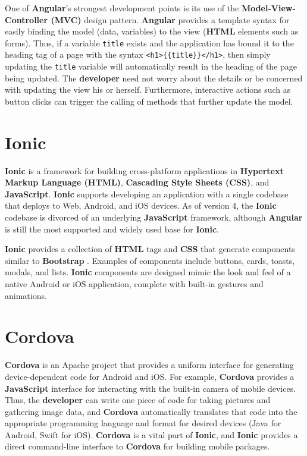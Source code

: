\documentclass[12pt]{report}
\begin{document}
One of \textbf{Angular}'s strongest development points is its use of the
\textbf{Model-View-Controller (MVC)} design pattern. \textbf{Angular} provides a
template syntax for easily binding the model (data, variables) to the view
(\textbf{HTML} elements such as forms). Thus, if a variable \texttt{title}
exists and the application has bound it to the heading tag of a page with the
syntax \texttt{<h1>\{\{title\}\}</h1>}, then simply updating the \texttt{title}
variable will automatically result in the heading of the page being updated. The
\textbf{developer} need not worry about the details or be concerned with
updating the view his or herself. Furthermore, interactive actions such as
button clicks can trigger the calling of methods that further update the model.
    
    \section{Ionic}

\textbf{Ionic} \cite{ionic} is a framework for building cross-platform
applications in \textbf{Hypertext Markup Language (HTML)}, \textbf{Cascading
Style Sheets (CSS)}, and \textbf{JavaScript}. \textbf{Ionic} supports developing
an application with a single codebase that deploys to Web, Android, and iOS
devices. As of version 4, the \textbf{Ionic} codebase is divorced of an
underlying \textbf{JavaScript} framework, although \textbf{Angular} is still the
most supported and widely used base for \textbf{Ionic}.

\textbf{Ionic} provides a collection of \textbf{HTML} tags and \textbf{CSS} that
generate components similar to \textbf{Bootstrap} \cite{bootstrap}.  Examples of
components include buttons, cards, toasts, modals, and lists.  \textbf{Ionic}
components are designed mimic the look and feel of a native Android or iOS
application, complete with built-in gestures and animations.
    
    \section{Cordova}

\textbf{Cordova} \cite{cordova} is an Apache project that provides a uniform
interface for generating device-dependent code for Android and iOS. For example,
\textbf{Cordova} provides a \textbf{JavaScript} interface for interacting with
the built-in camera of mobile devices. Thus, the \textbf{developer} can write
one piece of code for taking pictures and gathering image data, and
\textbf{Cordova} automatically translates that code into the appropriate
programming language and format for desired devices (Java for Android, Swift for
iOS). \textbf{Cordova} is a vital part of \textbf{Ionic}, and \textbf{Ionic}
provides a direct command-line interface to \textbf{Cordova} for building mobile
packages.
    
\end{document}
